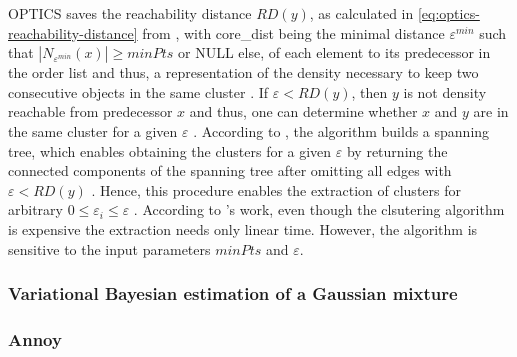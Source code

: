 OPTICS saves the reachability distance $RD(y)$, as calculated in \autoref{eq:optics-reachability-distance} from \cite{OPTICS2013},
with core\_dist being the minimal distance $\varepsilon^{min}$ such that $| N_{\varepsilon^{min}} (x) | \geq minPts$ or NULL else, 
of each element to its predecessor in the order list and thus, 
a representation of the density necessary to keep two consecutive objects in the same cluster \cite{OPTICS2013}.
If $\varepsilon < RD(y)$, then $y$ is not density reachable from predecessor $x$ and thus, 
one can determine whether $x$ and $y$ are in the same cluster for a given $\varepsilon$ \cite{OPTICS2013}.
According to \citeauthor{OPTICS2013}, the algorithm builds a spanning tree, which enables obtaining the clusters for a given $\varepsilon$ by returning the connected components 
of the spanning tree after omitting all edges with $\varepsilon < RD(y)$ \cite{OPTICS2013}.
Hence, this procedure enables the extraction of clusters for arbitrary $0 \le \varepsilon_i \le \varepsilon$ \cite{OPTICS_kMeans_2016}.
According to \citeauthor{OPTICS2013}'s work, even though the clsutering algorithm is expensive the extraction needs only linear time.
However, the algorithm is sensitive to the input parameters $minPts$ and $\varepsilon$.






\subsubsection{Variational Bayesian estimation of a Gaussian mixture}\label{subsec:varbayes}

\subsubsection{Annoy}\label{subsec:annoy}


